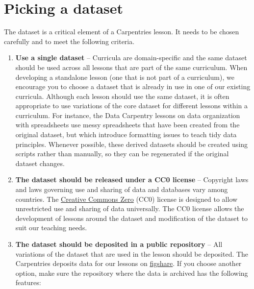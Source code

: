 \documentclass[]{book}
\begin{document}
\hypertarget{picking-a-dataset}{%
\section{Picking a dataset}\label{picking-a-dataset}}

The dataset is a critical element of a Carpentries lesson. It needs to be chosen carefully
and to meet the following criteria.

\begin{enumerate}
\def\labelenumi{\arabic{enumi}.}
\item
  \textbf{Use a single dataset} -- Curricula are domain-specific and the same dataset should be
  used across all lessons that are part of the same curriculum. When developing a
  standalone lesson (one that is not part of a curriculum), we encourage you to choose a
  dataset that is already in
  use in one of our existing curricula. Although each lesson should use the same dataset,
  it is often appropriate to use variations of the core dataset for different lessons within a
  curriculum. For instance, the Data Carpentry lessons on data organization with spreadsheets
  use messy spreadsheets that have been created from the
  original dataset, but which introduce formatting issues to teach tidy data principles.
  Whenever possible, these derived datasets should be created using scripts rather than
  manually, so they can be regenerated if the original dataset changes.
\item
  \textbf{The dataset should be released under a CC0 license} -- Copyright laws and laws
  governing use and sharing of data and databases vary among countries. The \href{https://creativecommons.org/share-your-work/public-domain/cc0/}{Creative Commons
  Zero} (CC0) license is designed to allow unrestricted use and sharing of data universally. The CC0
  license allows the development of lessons around the dataset and modification of the dataset
  to suit our teaching needs.
\item
  \textbf{The dataset should be deposited in a public repository} -- All variations of the
  dataset that are used in the lesson should be deposited. The Carpentries deposits
  data for our lessons on \href{https://figshare.com/}{figshare}.
  If you choose another option, make sure the repository where the data is archived
  has the following features:


\end{enumerate}
\end{document}
